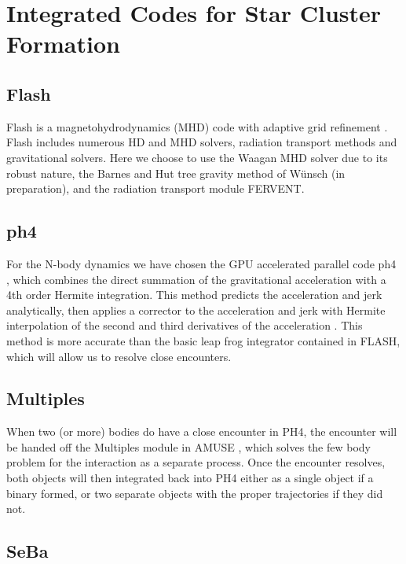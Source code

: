 \documentclass[11pt]{article}
\begin{document}
\section{Integrated Codes for Star Cluster Formation}


\subsection{Flash}

Flash is a magnetohydrodynamics (MHD) code with adaptive grid refinement \citep{FLASH}. Flash includes numerous HD and MHD solvers, radiation transport methods and gravitational solvers. Here we choose to use the Waagan MHD solver \citep{Waagan2011} due to its robust nature, the Barnes and Hut tree gravity method of W\"{u}nsch (in preparation), and the radiation transport module FERVENT.

\subsection{ph4}

For the N-body dynamics we have chosen the GPU accelerated parallel code ph4 \citep{ph4}, which combines the direct summation of the gravitational acceleration with a 4th order Hermite integration. This method predicts the acceleration and jerk analytically, then applies a corrector to the acceleration and jerk with Hermite interpolation of the second and third derivatives of the acceleration \citep{Makino4thHermite}. This method is more accurate than the basic leap frog integrator contained in FLASH, which will allow us to resolve close encounters.

\subsection{Multiples}

When two (or more) bodies do have a close encounter in PH4, the encounter will be handed off the Multiples module in AMUSE \citep{AMUSE}, which solves the few body problem for the interaction as a separate process. Once the encounter resolves, both objects will then integrated back into PH4 either as a single object if a binary formed, or two separate objects with the proper trajectories if they did not. 

\subsection{SeBa}
\end{document}
